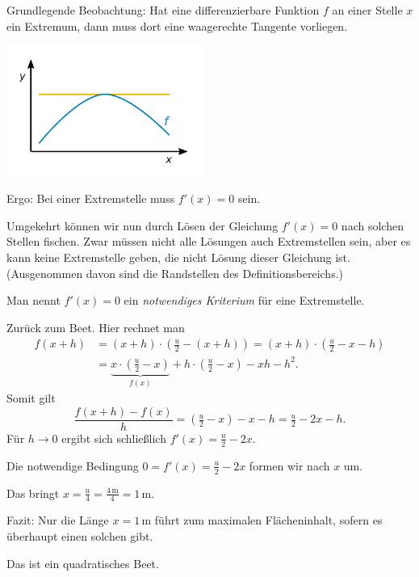\documentclass[9pt]{beamer}
\newcommand{\unit}[1]{\mathrm{#1}}
\begin{document}
\begin{frame}[t]
\vspace{3em}
Grundlegende Beobachtung: Hat eine differenzierbare Funktion $f$ an
einer Stelle $x$ ein Extremum, dann muss dort eine waagerechte
Tangente vorliegen.
\pause

\vspace{-0.5em}
\begin{center}
\includegraphics[width=64mm]{img/Maximum.pdf}
\end{center}
\end{frame}

\begin{frame}
Ergo: Bei einer Extremstelle muss $f'(x)=0$ sein.
\pause

\vspace{0.8em}
Umgekehrt können wir nun durch Lösen der Gleichung $f'(x)=0$ nach
solchen Stellen fischen. Zwar müssen nicht alle Lösungen auch
Extremstellen sein, aber es kann keine Extremstelle geben, die nicht
Lösung dieser Gleichung ist. {\footnotesize
(Ausgenommen davon sind die Randstellen des Definitionsbereichs.)}
\pause

\vspace{0.8em}
Man nennt $f'(x)=0$ ein \emph{notwendiges Kriterium} für eine
Extremstelle.
\end{frame}

\begin{frame}
Zurück zum Beet.\pause{} Hier rechnet man
\begin{align*}f(x+h) &= (x+h)\cdot(\tfrac{u}{2}-(x+h)) = (x+h)\cdot(\tfrac{u}{2}-x-h)\\
&= \underbrace{x\cdot(\tfrac{u}{2}-x)}_{f(x)} + h\cdot (\tfrac{u}{2}-x) - xh - h^2.
\end{align*}\pause
Somit gilt
\[\frac{f(x+h)-f(x)}{h} = (\tfrac{u}{2}-x) - x - h = \tfrac{u}{2}-2x-h.
\]\pause
Für $h\to 0$ ergibt sich schließlich $f'(x) = \tfrac{u}{2}-2x$.
\end{frame}

\begin{frame}
Die notwendige Bedingung $0=f'(x)=\tfrac{u}{2}-2x$ formen wir nach
$x$ um.\pause

\vspace{0.8em}
Das bringt $x = \tfrac{u}{4} = \tfrac{4\,\unit{m}}{4} = 1\,\unit{m}$.
\pause

\vspace{0.8em}
Fazit: Nur die Länge $x = 1\,\unit{m}$ führt zum maximalen
Flächeninhalt, sofern es überhaupt einen solchen gibt.

\vspace{0.8em}
Das ist ein quadratisches Beet.
\end{frame}
\end{document}
